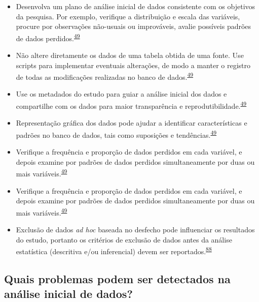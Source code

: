 \documentclass[
  a4paper,
]{book}
\begin{document}
\begin{itemize}
\item
  Desenvolva um plano de análise inicial de dados consistente com os objetivos da pesquisa. Por exemplo, verifique a distribuição e escala das variáveis, procure por observações não-usuais ou improváveis, avalie possíveis padrões de dados perdidos.\textsuperscript{\protect\hyperlink{ref-Baillie2022}{49}}
\item
  Não altere diretamente os dados de uma tabela obtida de uma fonte. Use scripts para implementar eventuais alterações, de modo a manter o registro de todas as modificações realizadas no banco de dados.\textsuperscript{\protect\hyperlink{ref-Baillie2022}{49}}
\item
  Use os metadados do estudo para guiar a análise inicial dos dados e compartilhe com os dados para maior transparência e reprodutibilidade.\textsuperscript{\protect\hyperlink{ref-Baillie2022}{49}}
\item
  Representação gráfica dos dados pode ajudar a identificar características e padrões no banco de dados, tais como suposições e tendências.\textsuperscript{\protect\hyperlink{ref-Baillie2022}{49}}
\item
  Verifique a frequência e proporção de dados perdidos em cada variável, e depois examine por padrões de dados perdidos simultaneamente por duas ou mais variáveis.\textsuperscript{\protect\hyperlink{ref-Baillie2022}{49}}
\item
  Verifique a frequência e proporção de dados perdidos em cada variável, e depois examine por padrões de dados perdidos simultaneamente por duas ou mais variáveis.\textsuperscript{\protect\hyperlink{ref-Baillie2022}{49}}
\item
  Exclusão de dados \emph{ad hoc} baseada no desfecho pode influenciar os resultados do estudo, portanto os critérios de exclusão de dados antes da análise estatística (descritiva e/ou inferencial) devem ser reportados.\textsuperscript{\protect\hyperlink{ref-Landis2012}{88}}
\end{itemize}

\hypertarget{quais-problemas-podem-ser-detectados-na-anuxe1lise-inicial-de-dados}{%
\subsection{Quais problemas podem ser detectados na análise inicial de dados?}\label{quais-problemas-podem-ser-detectados-na-anuxe1lise-inicial-de-dados}}
\end{document}

